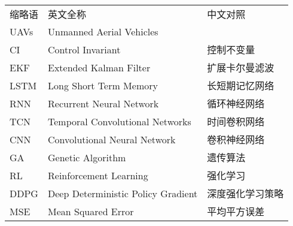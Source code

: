 \begin{tabular}{lll}
缩略语 & 英文全称 & 中文对照 \\
UAVs & Unmanned Aerial Vehicles\\
CI & Control Invariant & 控制不变量\\
EKF & Extended Kalman Filter & 扩展卡尔曼滤波 \\
LSTM & Long Short Term Memory & 长短期记忆网络 \\
RNN & Recurrent Neural Network & 循环神经网络 \\
TCN & Temporal Convolutional Networks & 时间卷积网络 \\
CNN & Convolutional Neural Network & 卷积神经网络 \\
GA & Genetic Algorithm & 遗传算法 \\
RL & Reinforcement Learning & 强化学习 \\
DDPG & Deep Deterministic Policy Gradient & 深度强化学习策略 \\
MSE & Mean Squared Error & 平均平方误差 \\
\end{tabular}